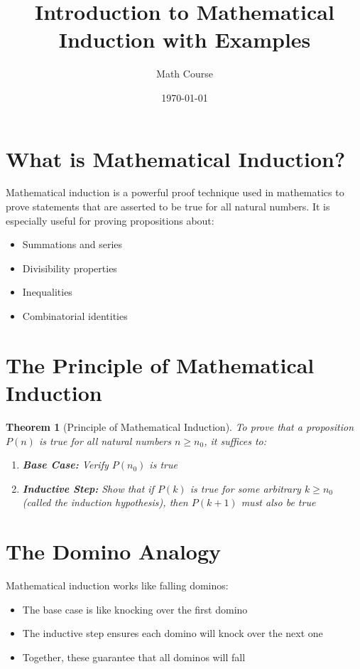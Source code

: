\documentclass{article}
\title{Introduction to Mathematical Induction with Examples}
\author{Math Course}
\date{\today}
\newtheorem{theorem}{Theorem}
\begin{document}
\maketitle

\section{What is Mathematical Induction?}
Mathematical induction is a powerful proof technique used in mathematics to prove statements that are asserted to be true for all natural numbers. It is especially useful for proving propositions about:
\begin{itemize}
    \item Summations and series
    \item Divisibility properties
    \item Inequalities
    \item Combinatorial identities
\end{itemize}

\section{The Principle of Mathematical Induction}
\begin{theorem}[Principle of Mathematical Induction]
    To prove that a proposition $P(n)$ is true for all natural numbers $n \geq n_0$, it suffices to:
    \begin{enumerate}
        \item \textbf{Base Case:} Verify $P(n_0)$ is true
        \item \textbf{Inductive Step:} Show that if $P(k)$ is true for some arbitrary $k \geq n_0$ (called the induction hypothesis), then $P(k+1)$ must also be true
    \end{enumerate}
\end{theorem}

\section{The Domino Analogy}
Mathematical induction works like falling dominos:
\begin{itemize}
    \item The base case is like knocking over the first domino
    \item The inductive step ensures each domino will knock over the next one
    \item Together, these guarantee that all dominos will fall
\end{itemize}
\end{document}
